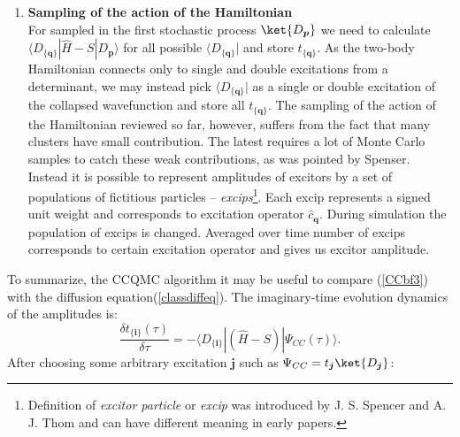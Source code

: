 \documentclass[twoside,english]{uiofysmaster}
\begin{document}
\begin{enumerate}
	\item
	\textbf{Sampling of the action of the Hamiltonian}\\
	For sampled in the first stochastic process $\ket{D_{\boldsymbol{p}}}$ we need to calculate  $\langle D_{\{\boldsymbol{q}\}}|\hat{H}-S|D_{\boldsymbol{p}}\rangle$ for all possible $\langle D_{\{\boldsymbol{q}\}}|$ and store $t_{\{\boldsymbol{q}\}}$. As the two-body Hamiltonian connects only to single and double excitations from a determinant, we may instead pick $\langle D_{\{\boldsymbol{q}\}}|$ as a single or double excitation of the collapsed wavefunction and store all $t_{ \{ \boldsymbol{q} \} }$.
	The sampling of the action of the Hamiltonian reviewed so far, however, suffers from the fact that many clusters have small contribution. The latest requires a lot of Monte Carlo samples to catch these weak contributions, as was pointed by Spenser\cite{ThomStochasticCoupledCluster2010}. Instead it is possible to represent amplitudes of excitors by a set of populations of fictitious particles -- \textit{excips}\footnote{Definition of \textit{excitor particle} or \textit{excip} was introduced by J. S. Spencer and A. J. Thom \cite{SpencerDevelopmentsstochasticcoupled2016} and can have different meaning in early papers.}. Each excip represents a signed unit weight and corresponds to excitation operator $\hat{c}_{\boldsymbol{q}}$. During simulation the population of excips is changed. Averaged over time number of excips corresponds to certain excitation operator and gives us excitor amplitude.
	
\end{enumerate}	

To summarize, the CCQMC algorithm it may be useful to compare
(\ref{CCbf3}) with the diffusion equation(\ref{classdiffeq}). The
imaginary-time evolution dynamics of the amplitudes is:
\begin{equation}\label{common0}
\frac{\delta t_{\{\boldsymbol{i}\}}(\tau)}{\delta \tau} = - \langle D_{\{\boldsymbol{i}\}}|(\hat{H}-S)|\Psi_{CC}(\tau)\rangle.
\end{equation}
After choosing some arbitrary excitation $\boldsymbol{j}$ such as $\Psi_{CC} = t_{\boldsymbol{j}}\ket{D_{\boldsymbol{j}}}$:
\end{document}
